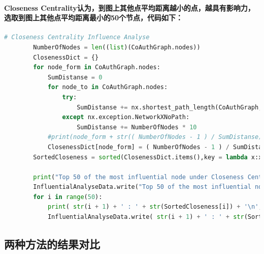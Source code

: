 \documentclass{ctexart}
\begin{document}
    \paragraph{
        Closeness Centrality认为，到图上其他点平均距离越小的点，越具有影响力，选取到图上其他点平均距离最小的50个节点，代码如下：\\
    }
    \begin{lstlisting}[language=python, basicstyle=\tiny,keywordstyle=\color{blue!100},commentstyle=\color{red!100!},frame=shadowbox, rulesepcolor=\color{red!20!green!20!blue!20}]
        # Closeness Centrality Influence Analyse
        NumberOfNodes = len((list)(CoAuthGraph.nodes))
        ClosenessDict = {}
        for node_form in CoAuthGraph.nodes:
            SumDistanse = 0
            for node_to in CoAuthGraph.nodes:
                try:
                    SumDistanse += nx.shortest_path_length(CoAuthGraph,node_form,node_to)
                except nx.exception.NetworkXNoPath:
                    SumDistanse += NumberOfNodes * 10
            #print(node_form + str(( NumberOfNodes - 1 ) / SumDistanse))
            ClosenessDict[node_form] = ( NumberOfNodes - 1 ) / SumDistanse
        SortedCloseness = sorted(ClosenessDict.items(),key = lambda x:x[1],reverse = True)

        print("Top 50 of the most influential node under Closeness Centrality: \n",end = '')
        InfluentialAnalyseData.write("Top 50 of the most influential node under Closeness Centrality: \n")
        for i in range(50):
            print( str(i + 1) + ' : ' + str(SortedCloseness[i]) + '\n',end = '')
            InfluentialAnalyseData.write( str(i + 1) + ' : ' + str(SortedCloseness[i]) + '\n')
    \end{lstlisting}
    \subsection{两种方法的结果对比}
\end{document}
